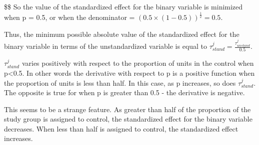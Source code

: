 \documentclass[
]{article}
\begin{document}
\$\$ So the value of the standardized effect for the binary variable is
minimized when p = 0.5, or when the denominator =
\((0.5 \times (1-0.5))^{\frac{1}{2}} = 0.5\).

Thus, the minimum possible absolute value of the standardized effect for
the binary variable in terms of the unstandardized variable is equal to
\(\tau^j_{stand} = \frac{\tau^j_{unstand}}{0.5}\).

\(\tau^j_{stand}\) varies positively with respect to the proportion of
units in the control when p\textless0.5. In other words the derivative
with respect to p is a positive function when the proportion of units is
less than half. In this case, as p increases, so does
\(\tau^j_{stand}\). The opposite is true for when p is greater than 0.5
- the derivative is negative.

This seems to be a strange feature. As greater than half of the
proportion of the study group is assigned to control, the standardized
effect for the binary variable decreases. When less than half is
assigned to control, the standardized effect increases.
\end{document}
